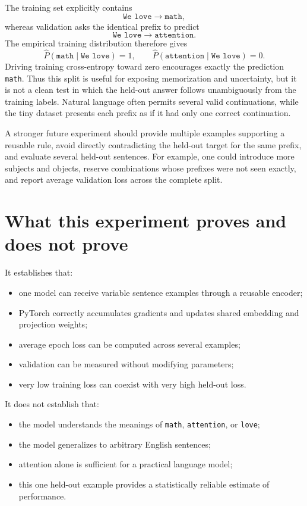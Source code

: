 \documentclass[11pt]{article}
\begin{document}
The training set explicitly contains
\[
\texttt{We love}\longrightarrow\texttt{math},
\]
whereas validation asks the identical prefix to predict
\[
\texttt{We love}\longrightarrow\texttt{attention}.
\]
The empirical training distribution therefore gives
\[
\widehat P(\texttt{math}\mid\texttt{We love})=1,
\qquad
\widehat P(\texttt{attention}\mid\texttt{We love})=0.
\]
Driving training cross-entropy toward zero encourages exactly the prediction \texttt{math}. Thus this split is
useful for exposing memorization and uncertainty, but it is not a clean test in which the held-out answer follows
unambiguously from the training labels. Natural language often permits several valid continuations, while the
tiny dataset presents each prefix as if it had only one correct continuation.

A stronger future experiment should provide multiple examples supporting a reusable rule, avoid directly
contradicting the held-out target for the same prefix, and evaluate several held-out sentences. For example, one
could introduce more subjects and objects, reserve combinations whose prefixes were not seen exactly, and report
average validation loss across the complete split.

\section{What this experiment proves and does not prove}

It establishes that:
\begin{itemize}
\item one model can receive variable sentence examples through a reusable encoder;
\item PyTorch correctly accumulates gradients and updates shared embedding and projection weights;
\item average epoch loss can be computed across several examples;
\item validation can be measured without modifying parameters;
\item very low training loss can coexist with very high held-out loss.
\end{itemize}

It does not establish that:
\begin{itemize}
\item the model understands the meanings of \texttt{math}, \texttt{attention}, or \texttt{love};
\item the model generalizes to arbitrary English sentences;
\item attention alone is sufficient for a practical language model;
\item this one held-out example provides a statistically reliable estimate of performance.
\end{itemize}
\end{document}
